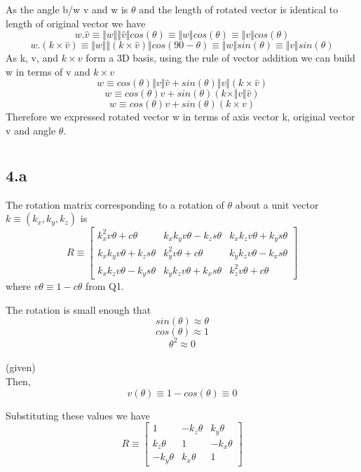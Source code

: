 \documentclass[12pt]{article}
\newcommand{\given}{{\\ \color{blue} \hspace*{\fill}(given)} \\}
\begin{document}
As the angle b/w v and w is $\theta$ and the length of rotated vector is identical to length of original vector we have
\[
  w . \hat{v} \equiv \Vert w \Vert \Vert \hat{v} \Vert cos(\theta) \equiv \Vert w \Vert cos(\theta) \equiv \Vert v \Vert cos(\theta)
\]
\[
  w . (k \times \hat{v}) \equiv \Vert w \Vert \Vert (k \times \hat{v}) \Vert cos(90 - \theta) \equiv \Vert w \Vert sin(\theta) \equiv \Vert v \Vert sin(\theta)
\]
As k, v, and $k \times v $ form a 3D basis, using the rule of vector addition we can build w in terms of v and $k \times v$
\[
  w \equiv cos(\theta) \Vert v \Vert \hat{v} + sin(\theta) \Vert v \Vert (k \times \hat{v})
\]
\[
  w \equiv cos(\theta) v + sin(\theta) (k \times \Vert v \Vert \hat{v})
\]
\[
  w \equiv cos(\theta) v + sin(\theta) (k \times v)
\]
Therefore we expressed rotated vector w in terms of axis vector k, original vector v and angle $\theta$.

\pagebreak

\section{}
\subsection*{4.a}
The rotation matrix corresponding to a rotation of $\theta$ about a unit vector $ k \equiv (k_x, k_y, k_z)$ is
\[
  R \equiv
  \begin{bmatrix}
    k_x^2v\theta + c\theta & k_xk_yv\theta - k_zs\theta & k_xk_zv\theta + k_ys\theta\\
    k_xk_yv\theta + k_zs\theta & k_y^2v\theta + c\theta & k_yk_zv\theta - k_xs\theta \\
    k_xk_zv\theta - k_ys\theta & k_yk_zv\theta + k_xs\theta & k_z^2v\theta + c\theta
  \end{bmatrix}
\]
where $v\theta \equiv 1 - c\theta$ from Q1.

The rotation is small enough that
\[
  sin(\theta) \approx \theta
\]
\[
  cos(\theta) \approx 1
\]
\[
  \theta^2 \approx 0
\]
\given

Then,
\[
  v(\theta) \equiv 1 - cos(\theta) \equiv 0
\]

Substituting these values we have
\[
  R \equiv
  \begin{bmatrix}
    1 & -k_z\theta & k_y\theta\\
     k_z\theta & 1 & -k_x\theta \\
     -k_y\theta & k_x\theta & 1
  \end{bmatrix}
\]
\pagebreak
\end{document}
